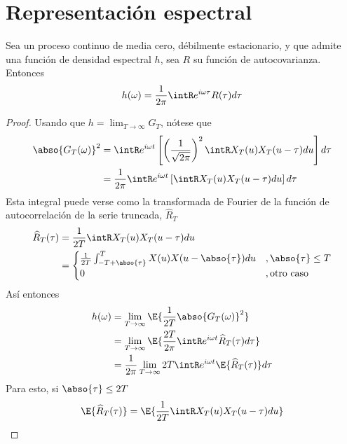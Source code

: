 \section{Representación espectral}
\label{sec:representacion}

\begin{teorema}
Sea \xt un proceso continuo de media cero, débilmente estacionario, y que admite una función de densidad espectral $h$, sea $R$ su función de autocovarianza. Entonces
\begin{equation}
h(\omega) = \frac{1}{2\pi} \intR e^{i \omega \tau} R(\tau) d\tau
\end{equation}
\label{teo:corr_four}
\end{teorema}
\begin{proof}
Usando que $h = \lim_{T\rightarrow\infty} G_T$, nótese que
\begin{align*}
\abso{G_T(\omega)}^{2} &= 
\intR e^{i \omega t} \left[ \left(\frac{1}{\sqrt{2\pi}} \right)^{2} \intR X_T(u) X_T(u-\tau) du \right] d\tau \\
&=
\frac{1}{2\pi} \intR e^{i \omega t} \left[ \intR X_T(u) X_T(u-\tau) du \right] d\tau \\
\end{align*}
Esta integral puede verse como la transformada de Fourier de la función de autocorrelación de la serie truncada, $\widehat{R}_T$
\begin{align*}
\widehat{R}_T (\tau) &= \frac{1}{2T} \intR X_T(u) X_T(u-\tau) du \\
&= \begin{cases}
\frac{1}{2T} \int_{-T+\abso{\tau}}^{T} X(u) X(u-\abso{\tau}) du &, \abso{\tau} \leq T \\
0 &, \text{otro caso}
\end{cases}
\end{align*}
Así entonces
\begin{align*}
h(\omega) &=
\lim_{T\rightarrow \infty} \E{\frac{1}{2T} \abso{G_T(\omega)}^{2}} \\
&=
\lim_{T\rightarrow \infty}
\E{\frac{2T}{2\pi} \intR e^{i \omega t} \widehat{R}_T(\tau) d\tau }\\
&=
\frac{1}{2\pi}
\lim_{T\rightarrow \infty}
2T \intR e^{i \omega t} \E{\widehat{R}_T(\tau)} d\tau\\
\end{align*}
Para esto, si $\abso{\tau} \leq 2T$
\begin{align*}
\E{\widehat{R}_T(\tau)} &=
\E{\frac{1}{2T} \intR X_T(u) X_T(u-\tau) du} \\

\end{align*}
\end{proof}
